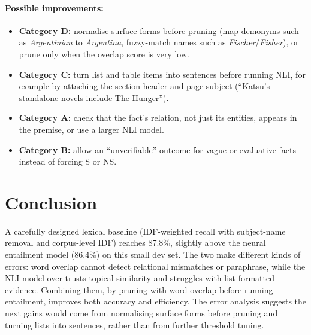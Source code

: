 \documentclass[12pt,a4paper]{article}
\begin{document}
\paragraph{Possible improvements:}
\begin{itemize}
\item \textbf{Category D:} normalise surface forms before pruning (map demonyms such as \emph{Argentinian} to \emph{Argentina}, fuzzy-match names such as \emph{Fischer}/\emph{Fisher}), or prune only when the overlap score is very low.
\item \textbf{Category C:} turn list and table items into sentences before running NLI, for example by attaching the section header and page subject (``Katsu's standalone novels include The Hunger'').
\item \textbf{Category A:} check that the fact's relation, not just its entities, appears in the premise, or use a larger NLI model.
\item \textbf{Category B:} allow an ``unverifiable'' outcome for vague or evaluative facts instead of forcing S or NS.
\end{itemize}

\section{Conclusion}
\label{sec:conclusion}
A carefully designed lexical baseline (IDF-weighted recall with subject-name removal and corpus-level IDF) reaches 87.8\%, slightly above the neural entailment model (86.4\%) on this small dev set. The two make different kinds of errors: word overlap cannot detect relational mismatches or paraphrase, while the NLI model over-trusts topical similarity and struggles with list-formatted evidence. Combining them, by pruning with word overlap before running entailment, improves both accuracy and efficiency. The error analysis suggests the next gains would come from normalising surface forms before pruning and turning lists into sentences, rather than from further threshold tuning.
\end{document}
